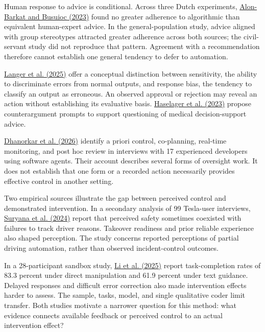 \documentclass[11pt]{article}
\begin{document}
Human response to advice is conditional. Across three Dutch experiments, \href{https://doi.org/10.1093/jopart/muac007}{Alon-Barkat and Busuioc (2023)} found no greater adherence to algorithmic than equivalent human-expert advice. In the general-population study, advice aligned with group stereotypes attracted greater adherence across both sources; the civil-servant study did not reproduce that pattern. Agreement with a recommendation therefore cannot establish one general tendency to defer to automation.

\href{https://doi.org/10.1007/s11023-024-09701-0}{Langer et al. (2025)} offer a conceptual distinction between sensitivity, the ability to discriminate errors from normal outputs, and response bias, the tendency to classify an output as erroneous. An observed approval or rejection may reveal an action without establishing its evaluative basis. \href{https://doi.org/10.1017/S0963180122000718}{Haselager et al. (2023)} propose counterargument prompts to support questioning of medical decision-support advice.

\href{https://doi.org/10.1145/3805689.3812402}{Dhanorkar et al. (2026)} identify a priori control, co-planning, real-time monitoring, and post hoc review in interviews with 17 experienced developers using software agents. Their account describes several forms of oversight work. It does not establish that one form or a recorded action necessarily provides effective control in another setting.

Two empirical sources illustrate the gap between perceived control and demonstrated intervention. In a secondary analysis of 99 Tesla-user interviews, \href{https://doi.org/10.48550/arXiv.2402.08080}{Suryana et al. (2024)} report that perceived safety sometimes coexisted with failures to track driver reasons. Takeover readiness and prior reliable experience also shaped perception. The study concerns reported perceptions of partial driving automation, rather than observed incident-control outcomes.

In a 28-participant sandbox study, \href{https://doi.org/10.1109/CAI64502.2025.00121}{Li et al. (2025)} report task-completion rates of 83.3 percent under direct manipulation and 61.9 percent under text guidance. Delayed responses and difficult error correction also made intervention effects harder to assess. The sample, tasks, model, and single qualitative coder limit transfer. Both studies motivate a narrower question for this method: what evidence connects available feedback or perceived control to an actual intervention effect?
\end{document}
